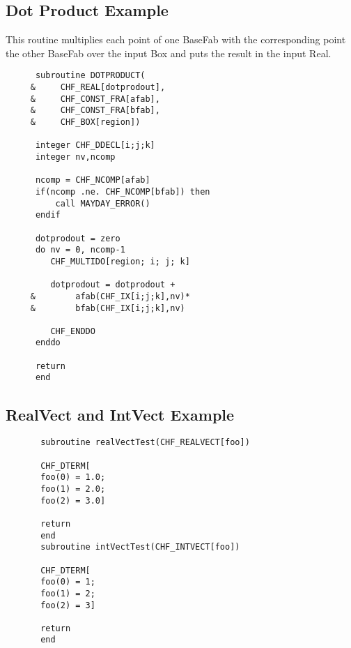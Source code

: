 \subsection{Dot Product Example}
This routine multiplies each point of one BaseFab with the
corresponding point the other BaseFab over the input Box
and puts the result in the input Real.
\begin{small}
\begin{verbatim}
      subroutine DOTPRODUCT(
     &     CHF_REAL[dotprodout],
     &     CHF_CONST_FRA[afab],
     &     CHF_CONST_FRA[bfab],
     &     CHF_BOX[region])

      integer CHF_DDECL[i;j;k]
      integer nv,ncomp
      
      ncomp = CHF_NCOMP[afab]
      if(ncomp .ne. CHF_NCOMP[bfab]) then
          call MAYDAY_ERROR()
      endif

      dotprodout = zero
      do nv = 0, ncomp-1
         CHF_MULTIDO[region; i; j; k]
         
         dotprodout = dotprodout +
     &        afab(CHF_IX[i;j;k],nv)*
     &        bfab(CHF_IX[i;j;k],nv)
         
         CHF_ENDDO
      enddo

      return 
      end
\end{verbatim}
\end{small}
\subsection{RealVect and IntVect Example}

\begin{small}
\begin{verbatim}
       subroutine realVectTest(CHF_REALVECT[foo])
       
       CHF_DTERM[
       foo(0) = 1.0;
       foo(1) = 2.0;
       foo(2) = 3.0]
       
       return
       end     
       subroutine intVectTest(CHF_INTVECT[foo])
       
       CHF_DTERM[
       foo(0) = 1;
       foo(1) = 2;
       foo(2) = 3]
       
       return
       end     
\end{verbatim}
\end{small}


